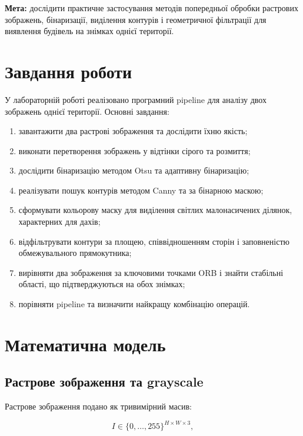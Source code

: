 \documentclass[12pt,a4paper]{article}
\begin{document}
\medskip

\noindent
\textbf{Мета:} дослідити практичне застосування методів попередньої обробки растрових зображень, бінаризації, виділення контурів і геометричної фільтрації для виявлення будівель на знімках однієї території.

\section{Завдання роботи}

У лабораторній роботі реалізовано програмний pipeline для аналізу двох зображень однієї території. Основні завдання:

\begin{enumerate}[leftmargin=*,itemsep=0.25em]
  \item завантажити два растрові зображення та дослідити їхню якість;
  \item виконати перетворення зображень у відтінки сірого та розмиття;
  \item дослідити бінаризацію методом Otsu та адаптивну бінаризацію;
  \item реалізувати пошук контурів методом Canny та за бінарною маскою;
  \item сформувати кольорову маску для виділення світлих малонасичених ділянок, характерних для дахів;
  \item відфільтрувати контури за площею, співвідношенням сторін і заповненістю обмежувального прямокутника;
  \item вирівняти два зображення за ключовими точками ORB і знайти стабільні області, що підтверджуються на обох знімках;
  \item порівняти pipeline та визначити найкращу комбінацію операцій.
\end{enumerate}

\section{Математична модель}

\subsection{Растрове зображення та grayscale}

Растрове зображення подано як тривимірний масив:

\begin{equation}
  I \in \{0,\ldots,255\}^{H \times W \times 3},
\end{equation}
\end{document}
